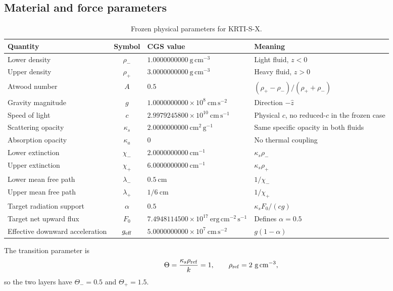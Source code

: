 \documentclass[11pt]{article}
\begin{document}
\subsection{Material and force parameters}
\begin{table}[H]
\centering
\caption{Frozen physical parameters for KRTI-S-X.}
\begin{tabularx}{\textwidth}{@{}lclX@{}}
\toprule
Quantity & Symbol & CGS value & Meaning \\
\midrule
Lower density & $\rho_-$ & $1.0000000000\ \mathrm{g\,cm^{-3}}$ & Light fluid, $z<0$ \\
Upper density & $\rho_+$ & $3.0000000000\ \mathrm{g\,cm^{-3}}$ & Heavy fluid, $z>0$ \\
Atwood number & $A$ & $0.5$ & $(\rho_+-\rho_-)/(\rho_++\rho_-)$ \\
Gravity magnitude & $g$ & $1.0000000000\times10^8\ \mathrm{cm\,s^{-2}}$ & Direction $-\hat z$ \\
Speed of light & $c$ & $2.9979245800\times10^{10}\ \mathrm{cm\,s^{-1}}$ & Physical $c$, no reduced-$c$ in the frozen case \\
Scattering opacity & $\kappa_s$ & $2.0000000000\ \mathrm{cm^2\,g^{-1}}$ & Same specific opacity in both fluids \\
Absorption opacity & $\kappa_a$ & $0$ & No thermal coupling \\
Lower extinction & $\chi_-$ & $2.0000000000\ \mathrm{cm^{-1}}$ & $\kappa_s\rho_-$ \\
Upper extinction & $\chi_+$ & $6.0000000000\ \mathrm{cm^{-1}}$ & $\kappa_s\rho_+$ \\
Lower mean free path & $\lambda_-$ & $0.5\ \mathrm{cm}$ & $1/\chi_-$ \\
Upper mean free path & $\lambda_+$ & $1/6\ \mathrm{cm}$ & $1/\chi_+$ \\
Target radiation support & $\alpha$ & $0.5$ & $\kappa_s F_0/(cg)$ \\
Target net upward flux & $F_0$ & $7.4948114500\times10^{17}\ \mathrm{erg\,cm^{-2}\,s^{-1}}$ & Defines $\alpha=0.5$ \\
Effective downward acceleration & $g_{\rm eff}$ & $5.0000000000\times10^7\ \mathrm{cm\,s^{-2}}$ & $g(1-\alpha)$ \\
\bottomrule
\end{tabularx}
\end{table}

The transition parameter is
\begin{equation}
\Theta=\frac{\kappa_s\rho_{\rm ref}}{k}=1,
\qquad \rho_{\rm ref}=2\ \mathrm{g\,cm^{-3}},
\end{equation}
so the two layers have $\Theta_-=0.5$ and $\Theta_+=1.5$.
\end{document}
